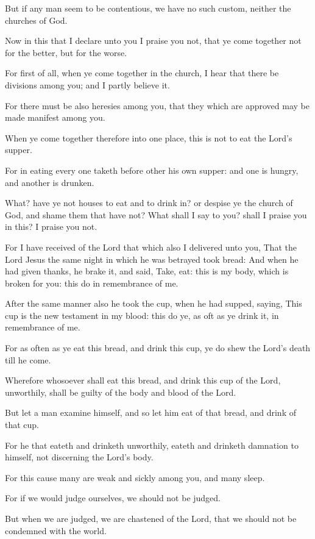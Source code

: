 \Verse But if any man seem to be contentious, we have no such custom, neither the churches of God.

\Verse Now in this that I declare unto you I praise you not, that ye come together not for the better, but for the worse.

\Verse For first of all, when ye come together in the church, I hear that there be divisions among you; and I partly believe it.

\Verse For there must be also heresies among you, that they which are approved may be made manifest among you.

\Verse When ye come together therefore into one place, this is not to eat the Lord's supper.

\Verse For in eating every one taketh before other his own supper: and one is hungry, and another is drunken.

\Verse What? have ye not houses to eat and to drink in? or despise ye the church of God, and shame them that have not? What shall I say to you? shall I praise you in this? I praise you not.

\Verse For I have received of the Lord that which also I delivered unto you, That the Lord Jesus the same night in which he was betrayed took bread: \Verse And when he had given thanks, he brake it, and said, Take, eat: this is my body, which is broken for you: this do in remembrance of me.

\Verse After the same manner also he took the cup, when he had supped, saying, This cup is the new testament in my blood: this do ye, as oft as ye drink it, in remembrance of me.

\Verse For as often as ye eat this bread, and drink this cup, ye do shew the Lord's death till he come.

\Verse Wherefore whosoever shall eat this bread, and drink this cup of the Lord, unworthily, shall be guilty of the body and blood of the Lord.

\Verse But let a man examine himself, and so let him eat of that bread, and drink of that cup.

\Verse For he that eateth and drinketh unworthily, eateth and drinketh damnation to himself, not discerning the Lord's body.

\Verse For this cause many are weak and sickly among you, and many sleep.

\Verse For if we would judge ourselves, we should not be judged.

\Verse But when we are judged, we are chastened of the Lord, that we should not be condemned with the world.

